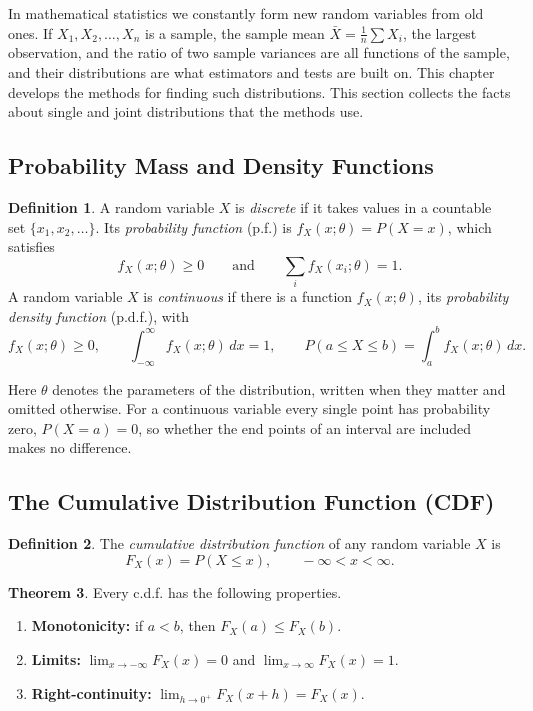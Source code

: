 \documentclass[12pt,a4paper]{report}
\theoremstyle{definition}
\newtheorem{thm}{Theorem}[section]
\newtheorem{definition}[thm]{Definition}
\theoremstyle{plain}
\begin{document}
In mathematical statistics we constantly form new random variables from old
ones. If $X_1, X_2, \dots, X_n$ is a sample, the sample mean
$\bar{X} = \frac{1}{n}\sum X_i$, the largest observation, and the ratio of two
sample variances are all functions of the sample, and their distributions are
what estimators and tests are built on. This chapter develops the methods for
finding such distributions. This section collects the facts about single and
joint distributions that the methods use.

\subsection{Probability Mass and Density Functions}

\begin{definition}
\label{def:pmfpdf}
A random variable $X$ is \emph{discrete} if it takes values in a countable set
$\{x_1, x_2,\dots\}$. Its \emph{probability function} (p.f.) is
$f_X(x;\theta) = P(X = x)$, which satisfies
\[f_X(x;\theta) \geq 0 \qquad\text{and}\qquad \sum_{i} f_X(x_i;\theta) = 1 .\]
A random variable $X$ is \emph{continuous} if there is a function
$f_X(x;\theta)$, its \emph{probability density function} (p.d.f.), with
\[f_X(x;\theta) \geq 0 ,\qquad \int_{-\infty}^{\infty} f_X(x;\theta)\, dx = 1
,\qquad P(a\leq X\leq b) = \int_a^b f_X(x;\theta)\,dx .\]
\end{definition}

Here $\theta$ denotes the parameters of the distribution, written when they
matter and omitted otherwise. For a continuous variable every single point has
probability zero, $P(X = a) = 0$, so whether the end points of an interval are
included makes no difference.

\subsection{The Cumulative Distribution Function (CDF)}

\begin{definition}
\label{def:cdf}
The \emph{cumulative distribution function} of any random variable $X$ is
\[F_X(x) = P(X \leq x),\qquad -\infty<x<\infty .\]
\end{definition}

\begin{thm}
\label{thm:cdfprops}
Every c.d.f. has the following properties.
\begin{enumerate}
\item \textbf{Monotonicity:} if $a < b$, then $F_X(a) \leq F_X(b)$.
\item \textbf{Limits:} $\lim_{x\to -\infty}F_X(x) = 0$ and
$\lim_{x\to\infty}F_X(x) = 1$.
\item \textbf{Right-continuity:} $\lim_{h \to 0^+} F_X(x+h) = F_X(x)$.
\end{enumerate}
\end{thm}
\end{document}
